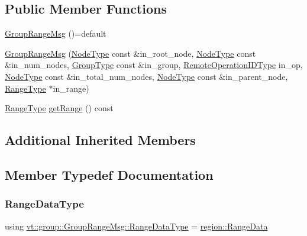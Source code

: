 \subsection*{Public Member Functions}
\begin{DoxyCompactItemize}
\item 
\hyperlink{structvt_1_1group_1_1_group_range_msg_a40399408026b4e5f866bfbf8e33ed735}{Group\+Range\+Msg} ()=default
\item 
\hyperlink{structvt_1_1group_1_1_group_range_msg_abdce0fab287c1c31fc36ce73a931f5e9}{Group\+Range\+Msg} (\hyperlink{namespacevt_a866da9d0efc19c0a1ce79e9e492f47e2}{Node\+Type} const \&in\+\_\+root\+\_\+node, \hyperlink{namespacevt_a866da9d0efc19c0a1ce79e9e492f47e2}{Node\+Type} const \&in\+\_\+num\+\_\+nodes, \hyperlink{namespacevt_a27b5e4411c9b6140c49100e050e2f743}{Group\+Type} const \&in\+\_\+group, \hyperlink{namespacevt_1_1group_a73f2624ddeb535b39a08b6524f26b244}{Remote\+Operation\+I\+D\+Type} in\+\_\+op, \hyperlink{namespacevt_a866da9d0efc19c0a1ce79e9e492f47e2}{Node\+Type} const \&in\+\_\+total\+\_\+num\+\_\+nodes, \hyperlink{namespacevt_a866da9d0efc19c0a1ce79e9e492f47e2}{Node\+Type} const \&in\+\_\+parent\+\_\+node, \hyperlink{structvt_1_1group_1_1_group_range_msg_a49fdcbb2ae53a4c5778e60f306c8f5e6}{Range\+Type} $\ast$in\+\_\+range)
\item 
\hyperlink{structvt_1_1group_1_1_group_range_msg_a49fdcbb2ae53a4c5778e60f306c8f5e6}{Range\+Type} \hyperlink{structvt_1_1group_1_1_group_range_msg_a9a3b75cee8d60df55ecf7c6f7a3772f1}{get\+Range} () const
\end{DoxyCompactItemize}
\subsection*{Additional Inherited Members}


\subsection{Member Typedef Documentation}
\mbox{\label{structvt_1_1group_1_1_group_range_msg_a893386277e3598ae990bea8245aee1f3}} 
\subsubsection{\texorpdfstring{Range\+Data\+Type}{RangeDataType}}
{\footnotesize\ttfamily using \hyperlink{structvt_1_1group_1_1_group_range_msg_a893386277e3598ae990bea8245aee1f3}{vt\+::group\+::\+Group\+Range\+Msg\+::\+Range\+Data\+Type} =  \hyperlink{structvt_1_1group_1_1region_1_1_range_data}{region\+::\+Range\+Data}}

